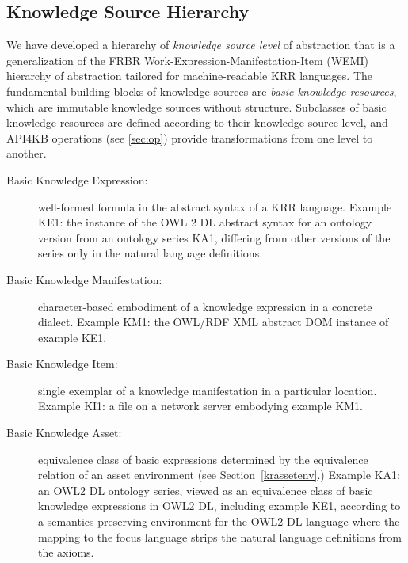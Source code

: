 \documentclass[runningheads]{llncs}
\begin{document}

\subsection{Knowledge Source Hierarchy}
We have developed a hierarchy of \emph{knowledge source level} of abstraction that is a generalization of the FRBR \cite{FRBR} Work-Expression-Manifestation-Item (WEMI) hierarchy of abstraction tailored for machine-readable KRR languages. The fundamental building blocks of knowledge sources are \emph{basic knowledge resources}, which are immutable knowledge sources without structure.
Subclasses of basic knowledge resources are defined according to their knowledge source level, and API4KB operations (see \ref{sec:op}) provide transformations from one level to another.
\begin{description}
\item[Basic Knowledge Expression:] well-formed formula in the abstract syntax of a KRR language.
Example KE1: the instance of the OWL 2 DL abstract syntax for an ontology version from an ontology series KA1, differing from other versions of the series only in the natural language definitions.
\item[Basic Knowledge Manifestation:] character-based embodiment of a knowledge expression in a concrete dialect. Example KM1: the OWL/RDF XML abstract DOM instance of example KE1.
\item[Basic Knowledge Item:] single exemplar of a knowledge manifestation in a particular location. Example KI1: a file on a network server embodying example KM1.
\item[Basic Knowledge Asset:] equivalence class of basic expressions determined by the equivalence relation of an asset environment (see Section~\ref{krassetenv}.) Example KA1: an OWL2 DL ontology series, viewed as an equivalence class of basic knowledge expressions in OWL2 DL, including example KE1, according to a semantics-preserving environment for the OWL2 DL language where the mapping to the focus language strips the natural language definitions from the axioms.
\end{description}
\end{document}
